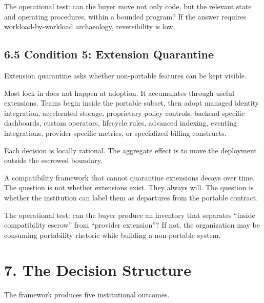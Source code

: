 \documentclass[11pt]{article}
\begin{document}
The operational test: can the buyer move not only code, but the relevant state and operating procedures, within a bounded program? If the answer requires workload-by-workload archaeology, reversibility is low.

\subsection{6.5 Condition 5: Extension Quarantine}\label{condition-5-extension-quarantine}

Extension quarantine asks whether non-portable features can be kept visible.

Most lock-in does not happen at adoption. It accumulates through useful extensions. Teams begin inside the portable subset, then adopt managed identity integration, accelerated storage, proprietary policy controls, backend-specific dashboards, custom operators, lifecycle rules, advanced indexing, eventing integrations, provider-specific metrics, or specialized billing constructs.

Each decision is locally rational. The aggregate effect is to move the deployment outside the escrowed boundary.

A compatibility framework that cannot quarantine extensions decays over time. The question is not whether extensions exist. They always will. The question is whether the institution can label them as departures from the portable contract.

The operational test: can the buyer produce an inventory that separates ``inside compatibility escrow'' from ``provider extension''? If not, the organization may be consuming portability rhetoric while building a non-portable system.

\section{7. The Decision Structure}\label{the-decision-structure}

The framework produces five institutional outcomes.
\end{document}
